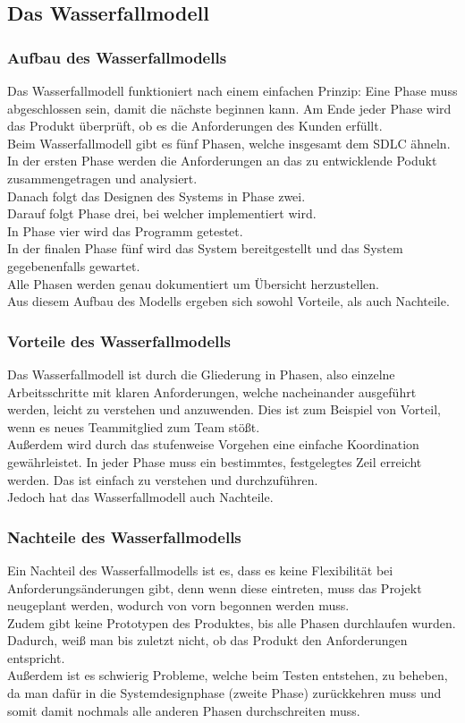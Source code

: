\documentclass[a4paper, 10pt]{scrartcl}
\begin{document}
\subsection{Das Wasserfallmodell}
\subsubsection{Aufbau des Wasserfallmodells}
Das Wasserfallmodell funktioniert nach einem einfachen Prinzip: Eine Phase muss abgeschlossen sein, damit die nächste beginnen kann. Am Ende jeder Phase wird das Produkt überprüft, ob es die Anforderungen des Kunden erfüllt.\\
Beim Wasserfallmodell gibt es fünf Phasen, welche insgesamt dem SDLC ähneln.\\
In der ersten Phase werden die Anforderungen an das zu entwicklende Podukt zusammengetragen und analysiert.\\
Danach folgt das Designen des Systems in Phase zwei.\\
Darauf folgt Phase drei, bei welcher implementiert wird.\\
In Phase vier wird das Programm getestet.\\
In der finalen Phase fünf wird das System bereitgestellt und das System gegebenenfalls gewartet.\\
Alle Phasen werden genau dokumentiert um Übersicht herzustellen. \citep{stoica}\\
Aus diesem Aufbau des Modells ergeben sich sowohl Vorteile, als auch Nachteile.
\subsubsection{Vorteile des Wasserfallmodells}
Das Wasserfallmodell ist durch die Gliederung in Phasen, also einzelne Arbeitsschritte mit klaren Anforderungen, welche nacheinander ausgeführt werden, leicht zu verstehen und anzuwenden. Dies ist zum Beispiel von Vorteil, wenn es neues Teammitglied zum Team stößt.\\
Außerdem wird durch das stufenweise Vorgehen eine einfache Koordination gewährleistet. In jeder Phase muss ein bestimmtes, festgelegtes Zeil erreicht werden. Das ist einfach zu verstehen und durchzuführen. \citep{stoica}\\
Jedoch hat das Wasserfallmodell auch Nachteile.
\subsubsection{Nachteile des Wasserfallmodells}
Ein Nachteil des Wasserfallmodells ist es, dass es keine Flexibilität bei Anforderungsänderungen gibt, denn wenn diese eintreten, muss das Projekt neugeplant werden, wodurch von vorn begonnen werden muss.\\
Zudem gibt keine Prototypen des Produktes, bis alle Phasen durchlaufen wurden. Dadurch, weiß man bis zuletzt nicht, ob das Produkt den Anforderungen entspricht.\\
Außerdem ist es schwierig Probleme, welche beim Testen entstehen, zu beheben, da man dafür in die Systemdesignphase (zweite Phase) zurückkehren muss und somit damit nochmals alle anderen Phasen durchschreiten muss. \citep{stoica}
\end{document}
